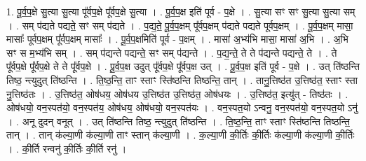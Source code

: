\documentclass[17pt]{extarticle}
\begin{document}
1. पू॒र्व॒प॒क्षे सु॒त्या सु॒त्या पू᳚र्वप॒क्षे पू᳚र्वप॒क्षे सु॒त्या । . पू॒र्व॒प॒क्ष इति॑ पूर्व - प॒क्षे । . सु॒त्या सꣳ सꣳ सु॒त्या सु॒त्या सम् । . सम् प॑द्यते पद्यते॒ सꣳ सम् प॑द्यते । . प॒द्य॒ते॒ पू॒र्व॒प॒क्षम् पू᳚र्वप॒क्षम् प॑द्यते पद्यते पूर्वप॒क्षम् । . पू॒र्व॒प॒क्षम् मासा॒ मासाः᳚ पूर्वप॒क्षम् पू᳚र्वप॒क्षम् मासाः᳚ । . पू॒र्व॒प॒क्षमिति॑ पूर्व - प॒क्षम् । . मासा॑ अ॒भ्य॑भि मासा॒ मासा॑ अ॒भि । . अ॒भि सꣳ स म॒भ्य॑भि सम् । . सम् प॑द्यन्ते पद्यन्ते॒ सꣳ सम् प॑द्यन्ते । . प॒द्य॒न्ते॒ ते ते प॑द्यन्ते पद्यन्ते॒ ते । . ते पू᳚र्वप॒क्षे पू᳚र्वप॒क्षे ते ते पू᳚र्वप॒क्षे । . पू॒र्व॒प॒क्ष उदुत् पू᳚र्वप॒क्षे पू᳚र्वप॒क्ष उत् । . पू॒र्व॒प॒क्ष इति॑ पूर्व - प॒क्षे । . उत् ति॑ष्ठन्ति तिष्ठ॒ न्त्युदुत् ति॑ष्ठन्ति । . ति॒ष्ठ॒न्ति॒ ताꣳ स्ताꣳ स्ति॑ष्ठन्ति तिष्ठन्ति॒ तान् । . तानु॒त्तिष्ठ॑त उ॒त्तिष्ठ॑त॒ स्ताꣳ स्ता नु॒त्तिष्ठ॑तः । . उ॒त्तिष्ठ॑त॒ ओष॑धय॒ ओष॑धय उ॒त्तिष्ठ॑त उ॒त्तिष्ठ॑त॒ ओष॑धयः । . उ॒त्तिष्ठ॑त॒ इत्यु॑त् - तिष्ठ॑तः । . ओष॑धयो॒ वन॒स्पत॑यो॒ वन॒स्पत॑य॒ ओष॑धय॒ ओष॑धयो॒ वन॒स्पत॑यः । . वन॒स्पत॒यो ऽन्वनु॒ वन॒स्पत॑यो॒ वन॒स्पत॒यो ऽनु॑ । . अनू दुदन् वनूत् । . उत् ति॑ष्ठन्ति तिष्ठ॒ न्त्युदुत् ति॑ष्ठन्ति । . ति॒ष्ठ॒न्ति॒ ताꣳ स्ताꣳ स्ति॑ष्ठन्ति तिष्ठन्ति॒ तान् । . तान् क॑ल्या॒णी क॑ल्या॒णी ताꣳ स्तान् क॑ल्या॒णी । . क॒ल्या॒णी की॒र्तिः की॒र्तिः क॑ल्या॒णी क॑ल्या॒णी की॒र्तिः । . की॒र्ति रन्वनु॑ की॒र्तिः की॒र्ति रनु॑ । \newline
\end{document}
